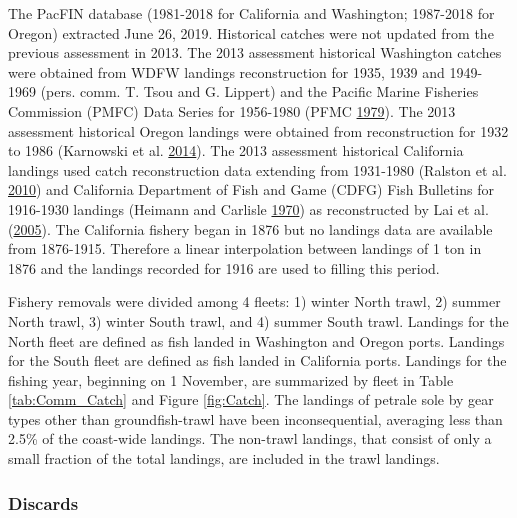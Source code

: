 \documentclass[12pt,]{article}
\begin{document}
The PacFIN database (1981-2018 for California and Washington; 1987-2018
for Oregon) extracted June 26, 2019. Historical catches were not updated
from the previous assessment in 2013. The 2013 assessment historical
Washington catches were obtained from WDFW landings reconstruction for
1935, 1939 and 1949- 1969 (pers. comm. T. Tsou and G. Lippert) and the
Pacific Marine Fisheries Commission (PMFC) Data Series for 1956-1980
(PFMC \protect\hyperlink{ref-pfmc_data_1979}{1979}). The 2013 assessment
historical Oregon landings were obtained from reconstruction for 1932 to
1986 (Karnowski et al.
\protect\hyperlink{ref-karnowski_historical_2014}{2014}). The 2013
assessment historical California landings used catch reconstruction data
extending from 1931-1980 (Ralston et al.
\protect\hyperlink{ref-ralston_documentation_2010}{2010}) and California
Department of Fish and Game (CDFG) Fish Bulletins for 1916-1930 landings
(Heimann and Carlisle
\protect\hyperlink{ref-heimann_pacific_1970}{1970}) as reconstructed by
Lai et al. (\protect\hyperlink{ref-lai_stock_2005}{2005}). The
California fishery began in 1876 but no landings data are available from
1876-1915. Therefore a linear interpolation between landings of 1 ton in
1876 and the landings recorded for 1916 are used to filling this period.

Fishery removals were divided among 4 fleets: 1) winter North trawl, 2)
summer North trawl, 3) winter South trawl, and 4) summer South trawl.
Landings for the North fleet are defined as fish landed in Washington
and Oregon ports. Landings for the South fleet are defined as fish
landed in California ports. Landings for the fishing year, beginning on
1 November, are summarized by fleet in Table \ref{tab:Comm_Catch} and
Figure \ref{fig:Catch}. The landings of petrale sole by gear types other
than groundfish-trawl have been inconsequential, averaging less than
2.5\% of the coast-wide landings. The non-trawl landings, that consist
of only a small fraction of the total landings, are included in the
trawl landings.

\subsubsection{Discards}\label{discards}
\end{document}
